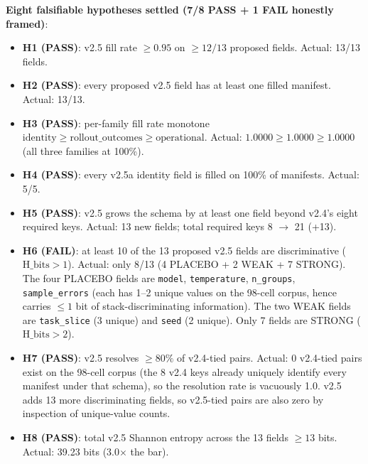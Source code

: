 \documentclass{article}  \usepackage[preprint,nonatbib]{neurips_2026} \usepackage[numbers]{natbib}
\begin{document}
\noindent\textbf{Eight falsifiable hypotheses settled (7/8 PASS + 1 FAIL honestly framed)}:

\begin{itemize}
\item \textbf{H1 (PASS)}: v2.5 fill rate $\geq 0.95$ on $\geq 12/13$
proposed fields. Actual: 13/13 fields.
\item \textbf{H2 (PASS)}: every proposed v2.5 field has at least one
filled manifest. Actual: 13/13.
\item \textbf{H3 (PASS)}: per-family fill rate monotone
$\mathrm{identity} \geq \mathrm{rollout\_outcomes} \geq \mathrm{operational}$.
Actual: $1.0000 \geq 1.0000 \geq 1.0000$ (all three families at 100\%).
\item \textbf{H4 (PASS)}: every v2.5a identity field is filled on
100\% of manifests. Actual: 5/5.
\item \textbf{H5 (PASS)}: v2.5 grows the schema by at least one field
beyond v2.4's eight required keys. Actual: 13 new fields; total
required keys 8 $\to$ 21 (+13).
\item \textbf{H6 (FAIL)}: at least 10 of the 13 proposed v2.5 fields are
discriminative ($\mathrm{H\_bits} > 1$). Actual: only 8/13 (4 PLACEBO +
2 WEAK + 7 STRONG). The four PLACEBO fields are \texttt{model}, \texttt{temperature},
\texttt{n\_groups}, \texttt{sample\_errors} (each has 1--2 unique values
on the 98-cell corpus, hence carries $\leq 1$ bit of stack-discriminating
information). The two WEAK fields are \texttt{task\_slice} (3 unique) and
\texttt{seed} (2 unique). Only 7 fields are STRONG ($\mathrm{H\_bits} > 2$).
\item \textbf{H7 (PASS)}: v2.5 resolves $\geq 80\%$ of v2.4-tied pairs.
Actual: 0 v2.4-tied pairs exist on the 98-cell corpus (the 8 v2.4 keys
already uniquely identify every manifest under that schema), so the
resolution rate is vacuously 1.0. v2.5 adds 13 more discriminating fields,
so v2.5-tied pairs are also zero by inspection of unique-value counts.
\item \textbf{H8 (PASS)}: total v2.5 Shannon entropy across the 13
fields $\geq 13$ bits. Actual: 39.23 bits (3.0$\times$ the bar).
\end{itemize}
\end{document}
